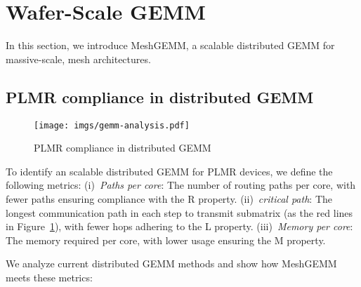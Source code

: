     \vspace{-3mm}
\section{Wafer-Scale GEMM} \label{sec:gemm}
    \vspace{-1mm}

In this section, we introduce MeshGEMM, a scalable distributed GEMM for massive-scale, mesh architectures. 

    \vspace{-3mm}
\subsection{PLMR compliance in distributed GEMM}
    \vspace{-1mm}

\begin{figure}
    \centering
    \texttt{[image: imgs/gemm-analysis.pdf]}
    \vspace{-3mm}
    \caption{PLMR compliance in distributed GEMM}
    \vspace{-3mm}
    \label{fig:distributed-gemm-analysis}
\end{figure}

To identify an scalable distributed GEMM for PLMR devices, we define the following metrics: 
(i)~\emph{Paths per core}: The number of routing paths per core, with fewer paths ensuring compliance with the R property.
(ii)~\emph{critical path}: The longest communication path in each step to transmit submatrix (as the red lines in Figure~\ref{fig:distributed-gemm-analysis}), with fewer hops adhering to the L property.
(iii)~\emph{Memory per core}: The memory required per core, with lower usage ensuring the M property.

We analyze current distributed GEMM methods and show how MeshGEMM meets these metrics:

